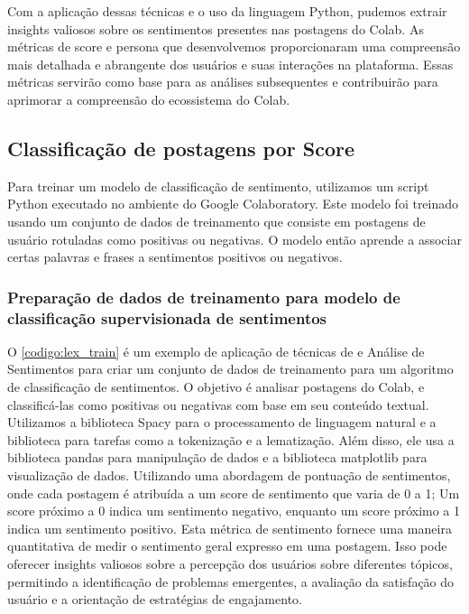 Com a aplicação dessas técnicas e o uso da linguagem Python, pudemos extrair insights valiosos sobre os sentimentos presentes nas postagens do Colab. As métricas de score e persona que desenvolvemos proporcionaram uma compreensão mais detalhada e abrangente dos usuários e suas interações na plataforma. Essas métricas servirão como base para as análises subsequentes e contribuirão para aprimorar a compreensão do ecossistema do Colab.

\subsection{Classificação de postagens por Score}
Para treinar um modelo de classificação de sentimento, utilizamos um script Python executado no ambiente do Google Colaboratory. Este modelo foi treinado usando um conjunto de dados de treinamento que consiste em postagens de usuário rotuladas como positivas ou negativas. O modelo então aprende a associar certas palavras e frases a sentimentos positivos ou negativos.

\subsubsection*{Preparação de dados de treinamento para modelo de classificação supervisionada de sentimentos}

O \autoref{codigo:lex_train} é um exemplo de aplicação de técnicas de  e Análise de Sentimentos para criar um conjunto de dados de treinamento para um algoritmo de classificação de sentimentos. O objetivo é analisar postagens do Colab, e classificá-las como positivas ou negativas com base em seu conteúdo textual. Utilizamos a biblioteca Spacy para o processamento de linguagem natural e a biblioteca  para tarefas como a tokenização e a lematização. Além disso, ele usa a biblioteca pandas para manipulação de dados e a biblioteca matplotlib para visualização de dados. Utilizando uma abordagem de pontuação de sentimentos, onde cada postagem é atribuída a um score de sentimento que varia de 0 a 1; Um score próximo a 0 indica um sentimento negativo, enquanto um score próximo a 1 indica um sentimento positivo. Esta métrica de sentimento fornece uma maneira quantitativa de medir o sentimento geral expresso em uma postagem. Isso pode oferecer insights valiosos sobre a percepção dos usuários sobre diferentes tópicos, permitindo a identificação de problemas emergentes, a avaliação da satisfação do usuário e a orientação de estratégias de engajamento.

